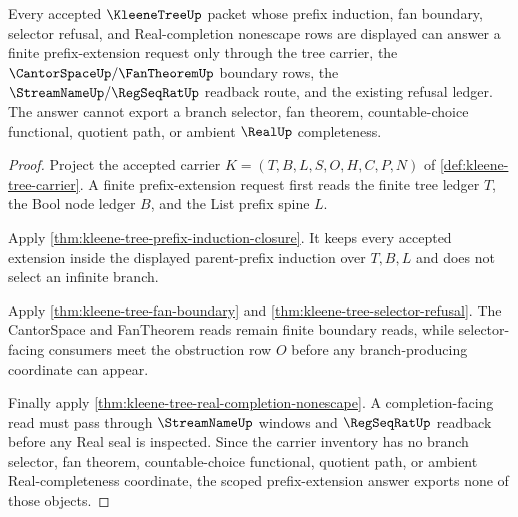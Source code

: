\begin{theorem}
\label{thm:kleene-tree-scoped-prefix-choice-refusal}
Every accepted $\KleeneTreeUp$ packet whose prefix induction, fan boundary, selector refusal, and Real-completion nonescape rows are displayed can answer a finite prefix-extension request only through the tree carrier, the $\CantorSpaceUp/\FanTheoremUp$ boundary rows, the $\StreamNameUp/\RegSeqRatUp$ readback route, and the existing refusal ledger. The answer cannot export a branch selector, fan theorem, countable-choice functional, quotient path, or ambient $\RealUp$ completeness.
\end{theorem}
\begin{proof}
Project the accepted carrier $K=(T,B,L,S,O,H,C,P,N)$ of \autoref{def:kleene-tree-carrier}. A finite prefix-extension request first reads the finite tree ledger $T$, the Bool node ledger $B$, and the List prefix spine $L$.

Apply \autoref{thm:kleene-tree-prefix-induction-closure}. It keeps every accepted extension inside the displayed parent-prefix induction over $T,B,L$ and does not select an infinite branch.

Apply \autoref{thm:kleene-tree-fan-boundary} and \autoref{thm:kleene-tree-selector-refusal}. The CantorSpace and FanTheorem reads remain finite boundary reads, while selector-facing consumers meet the obstruction row $O$ before any branch-producing coordinate can appear.

Finally apply \autoref{thm:kleene-tree-real-completion-nonescape}. A completion-facing read must pass through $\StreamNameUp$ windows and $\RegSeqRatUp$ readback before any Real seal is inspected. Since the carrier inventory has no branch selector, fan theorem, countable-choice functional, quotient path, or ambient Real-completeness coordinate, the scoped prefix-extension answer exports none of those objects.
\end{proof}


